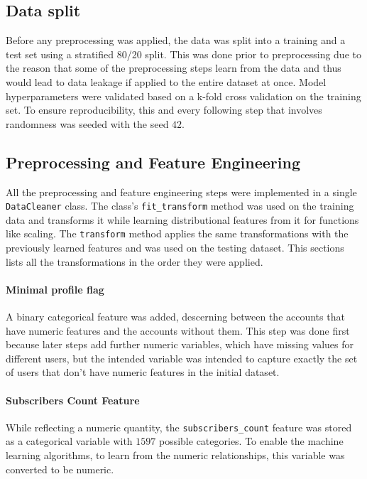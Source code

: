 \documentclass[twocolumn]{article}
\begin{document}
\subsection{Data split}

Before any preprocessing was applied, the data was split into a training and a test set using a stratified 80/20 split. This was done prior to preprocessing due to the reason that some of the preprocessing steps learn from the data and thus would lead to data leakage if applied to the entire dataset at once. Model hyperparameters were validated based on a k-fold cross validation on the training set. To ensure reproducibility, this and every following step that involves randomness was seeded with the seed $42$.

\subsection{Preprocessing and Feature Engineering}

All the preprocessing and feature engineering steps were implemented in a single \texttt{DataCleaner} class. The class's \texttt{fit\_transform} method was used on the training data and transforms it while learning distributional features from it for functions like scaling. The \texttt{transform} method applies the same transformations with the previously learned features and was used on the testing dataset. This sections lists all the transformations in the order they were applied.

\paragraph{Minimal profile flag}
A binary categorical feature was added, descerning between the accounts that have numeric features and the accounts without them. This step was done first because later steps add further numeric variables, which have missing values for different users, but the intended variable was intended to capture exactly the set of users that don't have numeric features in the initial dataset.

\paragraph{Subscribers Count Feature}
While reflecting a numeric quantity, the \texttt{subscribers\_count} feature was stored as a categorical variable with $1597$ possible categories. To enable the machine learning algorithms, to learn from the numeric relationships, this variable was converted to be numeric.
\end{document}
